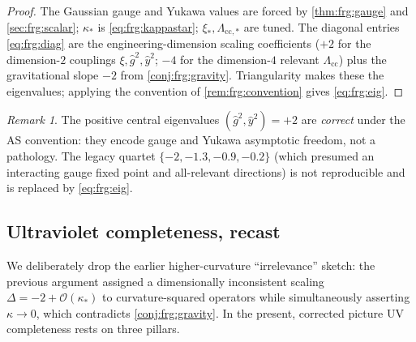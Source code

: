 \documentclass[11pt]{article}
\theoremstyle{plain}
\theoremstyle{definition}
\theoremstyle{remark}
\newtheorem{remark}[theorem]{Remark}
\begin{document}
\begin{proof}
The Gaussian gauge and Yukawa values are forced by \autoref{thm:frg:gauge}
and \autoref{sec:frg:scalar}; $\kappa_{\ast}$ is \eqref{eq:frg:kappastar};
$\xi_{\ast},\Lambda_{\mathrm{cc},\ast}$ are tuned. The diagonal entries
\eqref{eq:frg:diag} are the engineering-dimension scaling coefficients
($+2$ for the dimension-$2$ couplings $\xi,\hat g^{2},\hat y^{2}$; $-4$ for
the dimension-$4$ relevant $\Lambda_{\mathrm{cc}}$) plus the gravitational
slope $-2$ from \autoref{conj:frg:gravity}. Triangularity makes these the
eigenvalues; applying the convention of \autoref{rem:frg:convention} gives
\eqref{eq:frg:eig}.
\end{proof}

\begin{remark}
The positive central eigenvalues $(\hat g^{2},\hat y^{2})=+2$ are
\emph{correct} under the AS convention: they encode gauge and Yukawa
asymptotic freedom, not a pathology. The legacy quartet
$\{-2,-1.3,-0.9,-0.2\}$ (which presumed an interacting gauge fixed point
and all-relevant directions) is not reproducible and is replaced by
\eqref{eq:frg:eig}.
\end{remark}

\subsection{Ultraviolet completeness, recast}
\label{sec:frg:uvcomplete}

We deliberately drop the earlier higher-curvature ``irrelevance'' sketch:
the previous argument assigned a dimensionally inconsistent scaling
$\Delta=-2+\mathcal{O}(\kappa_{\ast})$ to curvature-squared operators while
simultaneously asserting $\kappa\to0$, which contradicts
\autoref{conj:frg:gravity}. In the present, corrected picture UV
completeness rests on three pillars.
\end{document}
